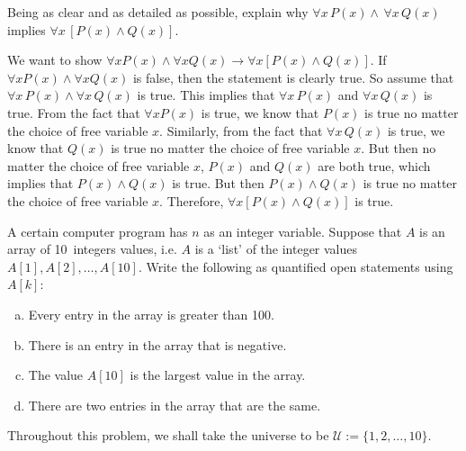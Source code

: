 \documentclass[11pt,letterpaper]{article}
\begin{document}
\newpage



 Being as clear and as detailed as possible, explain why $\forall x\, P(x) \wedge\, \forall x\, Q(x)$ implies $\forall x \, [P(x) \wedge Q(x)]$. \pspace

\sol We want to show $\forall x P(x) \wedge \forall x Q(x) \to \forall x [P(x) \wedge Q(x)]$. If $\forall x P(x) \wedge \forall x Q(x)$ is false, then the statement is clearly true. So assume that $\forall x\, P(x) \wedge \forall x\, Q(x)$ is true. This implies that $\forall x\, P(x)$ and $\forall x\, Q(x)$ is true. From the fact that $\forall x P(x)$ is true, we know that $P(x)$ is true no matter the choice of free variable $x$. Similarly, from the fact that $\forall x\, Q(x)$ is true, we know that $Q(x)$ is true no matter the choice of free variable $x$. But then no matter the choice of free variable $x$, $P(x)$ and $Q(x)$ are both true, which implies that $P(x) \wedge Q(x)$ is true. But then $P(x) \wedge Q(x)$ is true no matter the choice of free variable $x$. Therefore, $\forall x [P(x) \wedge Q(x)]$ is true.



\newpage



 A certain computer program has $n$ as an integer variable. Suppose that $A$ is an array of 10~integers values, i.e. $A$ is a `list' of the integer values $A[1], A[2], \ldots, A[10]$. Write the following as quantified open statements using $A[k]$:
	\begin{enumerate}[(a)]
	\item Every entry in the array is greater than 100.
	\item There is an entry in the array that is negative. 
	\item The value $A[10]$ is the largest value in the array.
	\item There are two entries in the array that are the same. 
	\end{enumerate} \pspace

\sol Throughout this problem, we shall take the universe to be $\mathcal{U}:= \{ 1, 2, \ldots, 10 \}$. 
\end{document}

